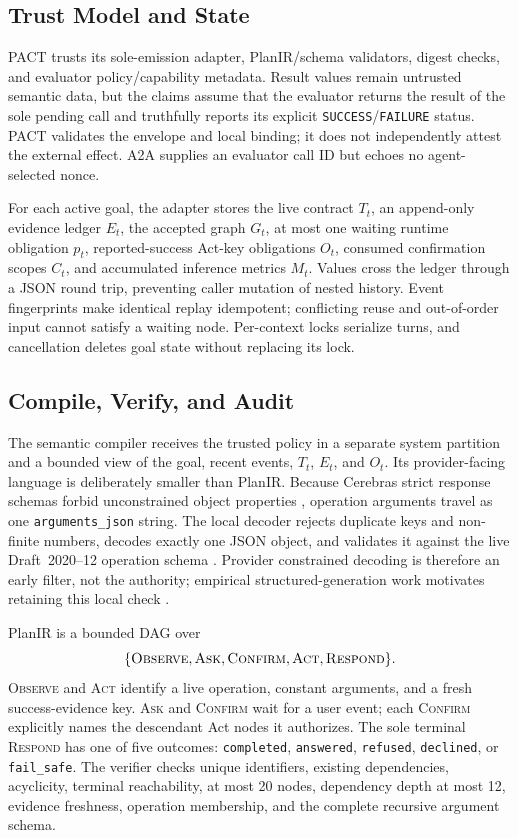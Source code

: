 \documentclass{article}
\begin{document}
\subsection{Trust Model and State}

PACT trusts its sole-emission adapter, PlanIR/schema validators, digest checks, and
evaluator policy/capability metadata.  Result values remain
untrusted semantic data, but the claims assume that the evaluator
returns the result of the sole pending call and truthfully reports its explicit
\texttt{SUCCESS}/\texttt{FAILURE} status.  PACT validates the envelope and
local binding; it does not independently attest the external effect.  A2A
supplies an evaluator call ID but echoes no agent-selected nonce.

For each active goal, the adapter stores the live contract $T_t$, an append-only
evidence ledger $E_t$, the accepted graph $G_t$, at most one waiting runtime
obligation $p_t$, reported-success Act-key obligations $O_t$, consumed
confirmation scopes $C_t$, and accumulated inference metrics $M_t$.  Values cross the
ledger through a JSON round trip, preventing caller mutation of nested history.
Event fingerprints make identical replay idempotent; conflicting reuse and
out-of-order input cannot satisfy a waiting node.  Per-context locks serialize
turns, and cancellation deletes goal state without replacing its lock.

\subsection{Compile, Verify, and Audit}

The semantic compiler receives the trusted policy in a separate system
partition and a bounded view of the goal, recent events, $T_t$, $E_t$, and
$O_t$.  Its provider-facing language is deliberately smaller than PlanIR.
Because Cerebras strict response schemas forbid unconstrained object
properties \cite{cerebras2026structured}, operation arguments travel as one
\texttt{arguments\_json} string.  The local decoder rejects duplicate keys and
non-finite numbers, decodes exactly one JSON object, and validates it against
the live Draft~2020--12 operation schema \cite{jsonschema2020}.  Provider
constrained decoding is therefore an early filter, not the authority; empirical
structured-generation work motivates retaining this local check
\cite{geng2025structured}.

PlanIR is a bounded DAG over
\[
 \{\textsc{Observe},\textsc{Ask},\textsc{Confirm},
   \textsc{Act},\textsc{Respond}\}.
\]
\textsc{Observe} and \textsc{Act} identify a live operation, constant
arguments, and a fresh success-evidence key.  \textsc{Ask} and
\textsc{Confirm} wait for a user event; each \textsc{Confirm} explicitly names
the descendant Act nodes it authorizes.  The sole terminal
\textsc{Respond} has one of five outcomes: \texttt{completed},
\texttt{answered}, \texttt{refused}, \texttt{declined}, or
\texttt{fail\_safe}.  The verifier checks unique identifiers, existing
dependencies, acyclicity, terminal reachability, at most 20 nodes, dependency
depth at most 12, evidence freshness, operation membership, and the complete
recursive argument schema.
\end{document}
